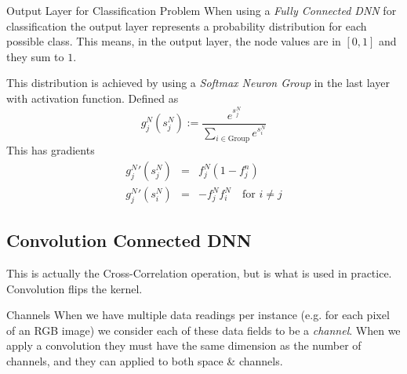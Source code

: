 \documentclass[11pt,a4paper]{article}
\begin{document}
  \begin{proposition}{Output Layer for Classification Problem}
    When using a \textit{Fully Connected DNN} for classification the output layer represents a probability distribution for each possible class. This means, in the output layer, the node values are in $[0,1]$ and they sum to $1$.
    \par This distribution is achieved by using a \textit{Softmax Neuron Group} in the last layer with activation function. Defined as
    \[  g_j^N(s_j^N):=\frac{e^{s_j^N}}{\displaystyle\sum_{i\in\text{Group}}e^{s_i^N}} \]
    This has gradients
    \[\begin{array}{rcl}
      {g_j^N}'(s_j^N)&=&f_j^N(1-f_j^n)\\
      {g_j^N}'(s_{i}^N)&=&-f_j^Nf_i^N\quad\text{for }i\neq j
    \end{array}\]
  \end{proposition}

\subsection{Convolution Connected DNN}

  \begin{remark}{This is actually the Cross-Correlation operation, but is what is used in practice.}
    Convolution flips the kernel.
  \end{remark}

  \begin{definition}{Channels}
    When we have multiple data readings per instance (e.g. for each pixel of an RGB image) we consider each of these data fields to be a \textit{channel}. When we apply a convolution they must have the same dimension as the number of channels, and they can applied to both space \& channels.
  \end{definition}
\end{document}
